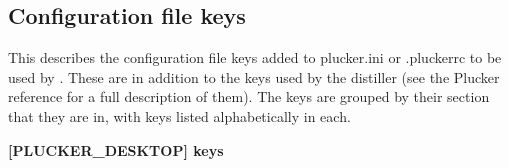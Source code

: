 \begin{helponly}
\section{Configuration file keys}\label{pd-configuration-file-keys}

This describes the configuration file keys added to plucker.ini or .pluckerrc
to be used by \brandingapplicationdesktopname. These are in addition to the keys used by the
\brandingapplicationsuitename distiller (see the Plucker reference for a full description of them).
The keys are grouped by their section that they are in, with keys listed 
alphabetically in each.


\bf{[PLUCKER\_DESKTOP] keys}


\end{helponly}
